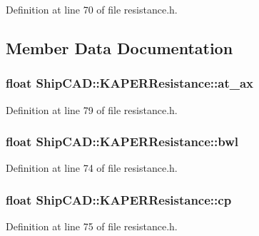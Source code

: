 Definition at line 70 of file resistance.\-h.



\subsection{Member Data Documentation}
\hypertarget{structShipCAD_1_1KAPERResistance_a803e780e97a79538c29af4a28c0afd51}{
\subsubsection[{at\-\_\-ax}]{\setlength{\rightskip}{0pt plus 5cm}float Ship\-C\-A\-D\-::\-K\-A\-P\-E\-R\-Resistance\-::at\-\_\-ax}}\label{structShipCAD_1_1KAPERResistance_a803e780e97a79538c29af4a28c0afd51}


Definition at line 79 of file resistance.\-h.

\hypertarget{structShipCAD_1_1KAPERResistance_ab1cc995ebce998cfc19ef8b1501f328e}{
\subsubsection[{bwl}]{\setlength{\rightskip}{0pt plus 5cm}float Ship\-C\-A\-D\-::\-K\-A\-P\-E\-R\-Resistance\-::bwl}}\label{structShipCAD_1_1KAPERResistance_ab1cc995ebce998cfc19ef8b1501f328e}


Definition at line 74 of file resistance.\-h.

\hypertarget{structShipCAD_1_1KAPERResistance_a07797d6eb31e9a5506f7fca4b92d3f3a}{
\subsubsection[{cp}]{\setlength{\rightskip}{0pt plus 5cm}float Ship\-C\-A\-D\-::\-K\-A\-P\-E\-R\-Resistance\-::cp}}\label{structShipCAD_1_1KAPERResistance_a07797d6eb31e9a5506f7fca4b92d3f3a}


Definition at line 75 of file resistance.\-h.

